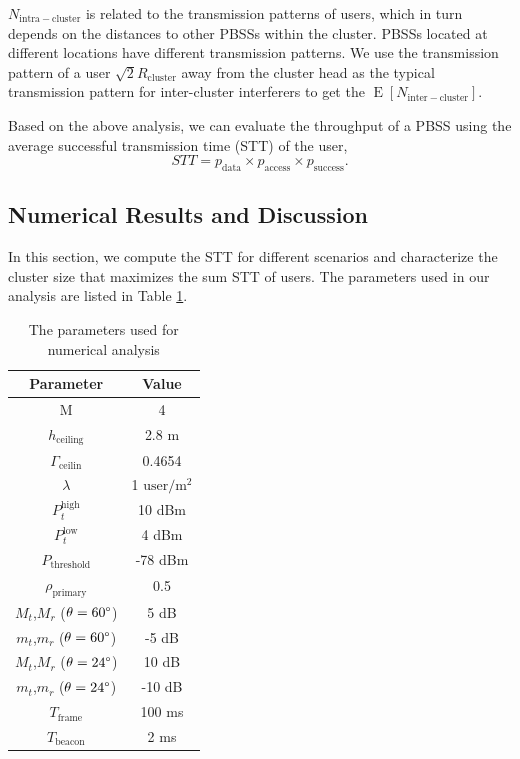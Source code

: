 \documentclass[10pt, conference, letterpaper]{IEEEtran}
\DeclareMathOperator*{\E}{\mathrm{E}}
\begin{document}
$N_{\mathrm{intra-cluster}}$ is related to the transmission patterns of users, which in turn depends on the distances to other PBSSs within the cluster. 
PBSSs located at different locations have different transmission patterns. 
We use the transmission pattern of a user $\sqrt{2}R_{\mathrm{cluster}}$ away from the cluster head as the typical transmission pattern for inter-cluster interferers to get the $\E[N_{\mathrm{inter-cluster}}]$.

Based on the above analysis, we can evaluate the throughput of a PBSS using the average successful transmission time (STT) of the user,
\begin{equation*}
STT = p_{\mathrm{data}}\times p_{\mathrm{access}} \times p_{\mathrm{success}}.
\end{equation*}

\subsection{Numerical Results and Discussion}
In this section, we compute the STT for different scenarios and characterize the cluster size that maximizes the sum STT of users. 
The parameters used in our analysis are listed in Table \ref{tab:clusteranalysis:parameter}.

\begin{table}
	\centering
	\caption{The parameters used for numerical analysis}
	\begin{tabular}{cc}
		\hline
		Parameter & Value \\
		\hline
		M & 4 \\
		$h_{\mathrm{ceiling}}$ & 2.8 m \\
		$\Gamma_{\mathrm{ceilin}}$ & 0.4654 \\
		$\lambda$ & 1 $\mathrm{user/m^2}$ \\
		$P_t^{\mathrm{high}}$ & 10 dBm \\
		$P_t^{\mathrm{low}}$ & 4 dBm \\
		$P_{\mathrm{threshold}}$ & -78 dBm \\
		$\rho_{\mathrm{primary}}$ & 0.5 \\
		$M_t$,$M_r$ ($\theta = 60\degree$) & 5 dB \\
		$m_t$,$m_r$ ($\theta = 60\degree$) & -5 dB \\
		$M_t$,$M_r$ ($\theta = 24\degree$) & 10 dB \\
		$m_t$,$m_r$ ($\theta = 24\degree$) & -10 dB \\		
		$T_{\mathrm{frame}}$ & 100 ms \\
		$T_{\mathrm{beacon}}$ & 2 ms \\
		\hline
	\end{tabular}
	\label{tab:clusteranalysis:parameter}	
\end{table}
\end{document}
